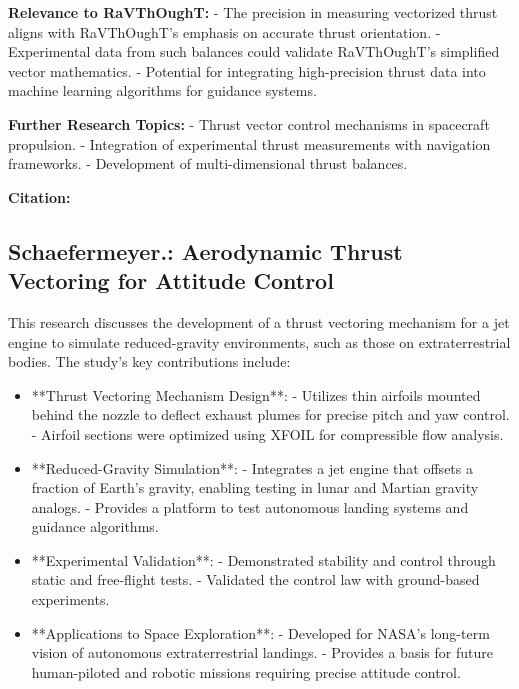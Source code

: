 \textbf{Relevance to RaVThOughT:}
- The precision in measuring vectorized thrust aligns with RaVThOughT's emphasis on accurate thrust orientation.
- Experimental data from such balances could validate RaVThOughT's simplified vector mathematics.
- Potential for integrating high-precision thrust data into machine learning algorithms for guidance systems.

\textbf{Further Research Topics:}
- Thrust vector control mechanisms in spacecraft propulsion.
- Integration of experimental thrust measurements with navigation frameworks.
- Development of multi-dimensional thrust balances.

\textbf{Citation:} 

\subsection{Schaefermeyer.: Aerodynamic Thrust Vectoring for Attitude Control}

This research discusses the development of a thrust vectoring mechanism for a jet engine to simulate reduced-gravity environments, such as those on extraterrestrial bodies. The study's key contributions include:

\begin{itemize}
  \item **Thrust Vectoring Mechanism Design**:
  - Utilizes thin airfoils mounted behind the nozzle to deflect exhaust plumes for precise pitch and yaw control.
  - Airfoil sections were optimized using XFOIL for compressible flow analysis.

  \item **Reduced-Gravity Simulation**:
  - Integrates a jet engine that offsets a fraction of Earth's gravity, enabling testing in lunar and Martian gravity analogs.
  - Provides a platform to test autonomous landing systems and guidance algorithms.

  \item **Experimental Validation**:
  - Demonstrated stability and control through static and free-flight tests.
  - Validated the control law with ground-based experiments.

  \item **Applications to Space Exploration**:
  - Developed for NASA's long-term vision of autonomous extraterrestrial landings.
  - Provides a basis for future human-piloted and robotic missions requiring precise attitude control.
\end{itemize}


